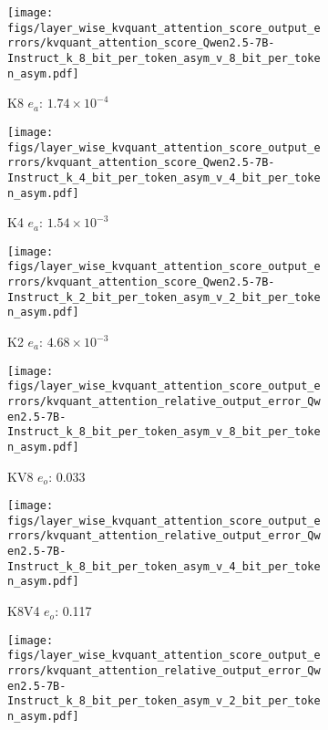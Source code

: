 \begin{figure}
    \centering
    \begin{subfigure}{0.25\columnwidth}
    \texttt{[image: figs/layer\_wise\_kvquant\_attention\_score\_output\_errors/kvquant\_attention\_score\_Qwen2.5-7B-Instruct\_k\_8\_bit\_per\_token\_asym\_v\_8\_bit\_per\_token\_asym.pdf]}
    \caption{K8 $e_a$: $1.74\times 10^{-4}$}
    \label{fig:kvcache_simulated_quant_attention_score_error_layer_wise_k8v8_per_token_asym_Qwen2.5-7B-Instruct}
    \end{subfigure}
    \begin{subfigure}{0.25\columnwidth}
    \texttt{[image: figs/layer\_wise\_kvquant\_attention\_score\_output\_errors/kvquant\_attention\_score\_Qwen2.5-7B-Instruct\_k\_4\_bit\_per\_token\_asym\_v\_4\_bit\_per\_token\_asym.pdf]}
    \caption{K4 $e_a$: $1.54\times 10^{-3}$}
    \label{fig:kvcache_simulated_quant_attention_score_error_layer_wise_k4v4_per_token_asym_Qwen2.5-7B-Instruct}
    \end{subfigure}
    \begin{subfigure}{0.25\columnwidth}
    \texttt{[image: figs/layer\_wise\_kvquant\_attention\_score\_output\_errors/kvquant\_attention\_score\_Qwen2.5-7B-Instruct\_k\_2\_bit\_per\_token\_asym\_v\_2\_bit\_per\_token\_asym.pdf]}
    \caption{K2 $e_a$: $4.68\times 10^{-3}$}
    \label{fig:kvcache_simulated_quant_attention_score_error_layer_wise_k2v2_per_token_asym_Qwen2.5-7B-Instruct}
    \end{subfigure}
    \begin{subfigure}{0.25\columnwidth}
    \texttt{[image: figs/layer\_wise\_kvquant\_attention\_score\_output\_errors/kvquant\_attention\_relative\_output\_error\_Qwen2.5-7B-Instruct\_k\_8\_bit\_per\_token\_asym\_v\_8\_bit\_per\_token\_asym.pdf]}
    \caption{KV8 $e_o$: 0.033}
    \label{fig:kvcache_simulated_quant_error_layer_wise_k8v8_per_token_asym_Qwen2.5-7B-Instruct}
    \end{subfigure}
    \begin{subfigure}{0.25\columnwidth}
    \texttt{[image: figs/layer\_wise\_kvquant\_attention\_score\_output\_errors/kvquant\_attention\_relative\_output\_error\_Qwen2.5-7B-Instruct\_k\_8\_bit\_per\_token\_asym\_v\_4\_bit\_per\_token\_asym.pdf]}
    \caption{K8V4 $e_o$: 0.117}
    \label{fig:kvcache_simulated_quant_error_layer_wise_k8v4_per_token_asym_Qwen2.5-7B-Instruct}
    \end{subfigure}
    \begin{subfigure}{0.25\columnwidth}
    \texttt{[image: figs/layer\_wise\_kvquant\_attention\_score\_output\_errors/kvquant\_attention\_relative\_output\_error\_Qwen2.5-7B-Instruct\_k\_8\_bit\_per\_token\_asym\_v\_2\_bit\_per\_token\_asym.pdf]}

\end{subfigure}
\end{figure}
